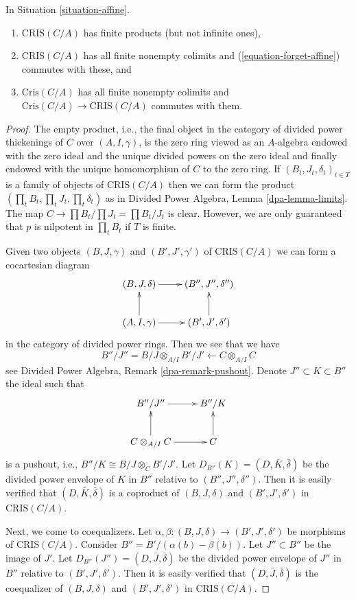 \begin{lemma}
\label{lemma-affine-thickenings-colimits}
In Situation \ref{situation-affine}.
\begin{enumerate}
\item $\text{CRIS}(C/A)$ has finite products (but not infinite ones),
\item $\text{CRIS}(C/A)$ has all finite nonempty colimits and
(\ref{equation-forget-affine}) commutes with these, and
\item $\text{Cris}(C/A)$ has all finite nonempty colimits and
$\text{Cris}(C/A) \to \text{CRIS}(C/A)$ commutes with them.
\end{enumerate}
\end{lemma}

\begin{proof}
The empty product, i.e., the final object in the category of divided
power thickenings of $C$ over $(A, I, \gamma)$, is the zero ring viewed
as an $A$-algebra endowed with the zero ideal and the unique divided powers
on the zero ideal and finally endowed with the unique homomorphism of $C$ to
the zero ring. If $(B_t, J_t, \delta_t)_{t \in T}$ is a family of objects of
$\text{CRIS}(C/A)$ then we can form the product
$(\prod_t B_t, \prod_t J_t, \prod_t \delta_t)$ as in
Divided Power Algebra, Lemma \ref{dpa-lemma-limits}.
The map $C \to \prod B_t/\prod J_t = \prod B_t/J_t$ is clear.
However, we are only guaranteed that $p$ is nilpotent in $\prod_t B_t$
if $T$ is finite.

\medskip\noindent
Given two objects $(B, J, \gamma)$ and $(B', J', \gamma')$ of
$\text{CRIS}(C/A)$ we can form a cocartesian diagram
$$
\xymatrix{
(B, J, \delta) \ar[r] & (B'', J'', \delta'') \\
(A, I, \gamma) \ar[r] \ar[u] & (B', J', \delta') \ar[u]
}
$$
in the category of divided power rings. Then we see that we have
$$
B''/J'' = B/J \otimes_{A/I} B'/J' \longleftarrow C \otimes_{A/I} C
$$
see Divided Power Algebra, Remark \ref{dpa-remark-pushout}.
Denote $J'' \subset K \subset B''$
the ideal such that
$$
\xymatrix{
B''/J'' \ar[r] & B''/K \\
C \otimes_{A/I} C \ar[r] \ar[u] & C \ar[u]
}
$$
is a pushout, i.e., $B''/K \cong B/J \otimes_C B'/J'$.
Let $D_{B''}(K) = (D, \bar K, \bar \delta)$
be the divided power envelope of $K$ in $B''$ relative to
$(B'', J'', \delta'')$. Then it is easily verified that
$(D, \bar K, \bar \delta)$ is a coproduct of $(B, J, \delta)$ and
$(B', J', \delta')$ in $\text{CRIS}(C/A)$.

\medskip\noindent
Next, we come to coequalizers. Let
$\alpha, \beta : (B, J, \delta) \to (B', J', \delta')$ be morphisms of
$\text{CRIS}(C/A)$. Consider $B'' = B'/ (\alpha(b) - \beta(b))$. Let
$J'' \subset B''$ be the image of $J'$. Let
$D_{B''}(J'') = (D, \bar J, \bar\delta)$ be the divided power envelope of
$J''$ in $B''$ relative to $(B', J', \delta')$. Then it is easily verified
that $(D, \bar J, \bar \delta)$ is the coequalizer of $(B, J, \delta)$ and
$(B', J', \delta')$ in $\text{CRIS}(C/A)$.


\end{proof}

